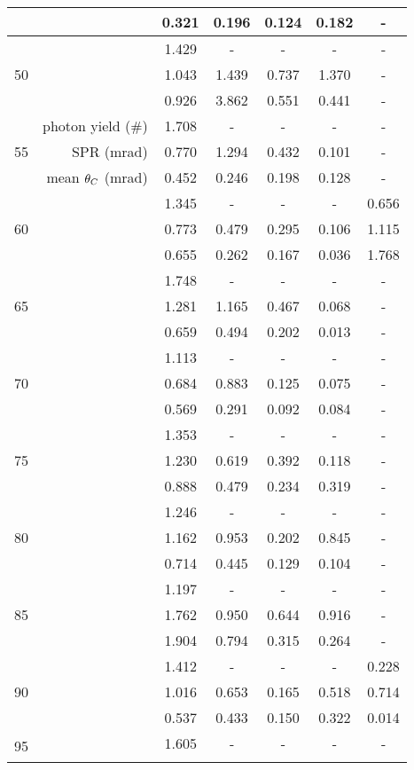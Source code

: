\begin{longtable}{|crccccc|}
	 &  & 0.321 & 0.196 & 0.124 & 0.182 & - \\ \hline 
\multirow{3}{*}{50} &  & 1.429 & - & - & - & - \\* 
	 &  & 1.043 & 1.439 & 0.737 & 1.370 & - \\* 
	 &  & 0.926 & 3.862 & 0.551 & 0.441 & - \\ \hline 
\multirow{3}{*}{55} & photon yield (\#) & 1.708 & - & - & - & - \\* 
	 & SPR (mrad) & 0.770 & 1.294 & 0.432 & 0.101 & - \\* 
	 & mean $\theta_{C}$ (mrad) & 0.452 & 0.246 & 0.198 & 0.128 & - \\ \hline 
\multirow{3}{*}{60} &  & 1.345 & - & - & - & 0.656 \\* 
	 &  & 0.773 & 0.479 & 0.295 & 0.106 & 1.115 \\* 
	 &  & 0.655 & 0.262 & 0.167 & 0.036 & 1.768 \\ \hline 
\multirow{3}{*}{65} &  & 1.748 & - & - & - & - \\* 
	 &  & 1.281 & 1.165 & 0.467 & 0.068 & - \\* 
	 &  & 0.659 & 0.494 & 0.202 & 0.013 & - \\ \hline 
\multirow{3}{*}{70} &  & 1.113 & - & - & - & - \\* 
	 &  & 0.684 & 0.883 & 0.125 & 0.075 & - \\* 
	 &  & 0.569 & 0.291 & 0.092 & 0.084 & - \\ \hline 
\multirow{3}{*}{75} &  & 1.353 & - & - & - & - \\* 
	 &  & 1.230 & 0.619 & 0.392 & 0.118 & - \\* 
	 &  & 0.888 & 0.479 & 0.234 & 0.319 & - \\ \hline 
\multirow{3}{*}{80} &  & 1.246 & - & - & - & - \\* 
	 &  & 1.162 & 0.953 & 0.202 & 0.845 & - \\* 
	 &  & 0.714 & 0.445 & 0.129 & 0.104 & - \\ \hline 
\multirow{3}{*}{85} &  & 1.197 & - & - & - & - \\* 
	 &  & 1.762 & 0.950 & 0.644 & 0.916 & - \\* 
	 &  & 1.904 & 0.794 & 0.315 & 0.264 & - \\ \hline 
\multirow{3}{*}{90} &  & 1.412 & - & - & - & 0.228 \\* 
	 &  & 1.016 & 0.653 & 0.165 & 0.518 & 0.714 \\* 
	 &  & 0.537 & 0.433 & 0.150 & 0.322 & 0.014 \\ \hline 
\multirow{3}{*}{95} &  & 1.605 & - & - & - & - \\* 

\end{longtable}
